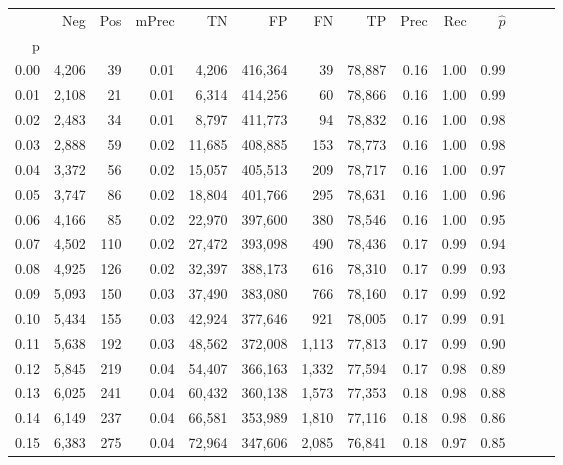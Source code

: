 \begin{tabular}{rrrrrrrrrrrrrr}
\toprule
{} &    Neg &    Pos & mPrec &       TN &       FP &      FN &      TP &  Prec &   Rec & $\hat{p}$ \\
p    &        &        &       &          &          &         &         &       &       &           \\
\midrule
0.00 &  4,206 &     39 &  0.01 &    4,206 &  416,364 &      39 &  78,887 &  0.16 &  1.00 &      0.99 \\
0.01 &  2,108 &     21 &  0.01 &    6,314 &  414,256 &      60 &  78,866 &  0.16 &  1.00 &      0.99 \\
0.02 &  2,483 &     34 &  0.01 &    8,797 &  411,773 &      94 &  78,832 &  0.16 &  1.00 &      0.98 \\
0.03 &  2,888 &     59 &  0.02 &   11,685 &  408,885 &     153 &  78,773 &  0.16 &  1.00 &      0.98 \\
0.04 &  3,372 &     56 &  0.02 &   15,057 &  405,513 &     209 &  78,717 &  0.16 &  1.00 &      0.97 \\
0.05 &  3,747 &     86 &  0.02 &   18,804 &  401,766 &     295 &  78,631 &  0.16 &  1.00 &      0.96 \\
0.06 &  4,166 &     85 &  0.02 &   22,970 &  397,600 &     380 &  78,546 &  0.16 &  1.00 &      0.95 \\
0.07 &  4,502 &    110 &  0.02 &   27,472 &  393,098 &     490 &  78,436 &  0.17 &  0.99 &      0.94 \\
0.08 &  4,925 &    126 &  0.02 &   32,397 &  388,173 &     616 &  78,310 &  0.17 &  0.99 &      0.93 \\
0.09 &  5,093 &    150 &  0.03 &   37,490 &  383,080 &     766 &  78,160 &  0.17 &  0.99 &      0.92 \\
0.10 &  5,434 &    155 &  0.03 &   42,924 &  377,646 &     921 &  78,005 &  0.17 &  0.99 &      0.91 \\
0.11 &  5,638 &    192 &  0.03 &   48,562 &  372,008 &   1,113 &  77,813 &  0.17 &  0.99 &      0.90 \\
0.12 &  5,845 &    219 &  0.04 &   54,407 &  366,163 &   1,332 &  77,594 &  0.17 &  0.98 &      0.89 \\
0.13 &  6,025 &    241 &  0.04 &   60,432 &  360,138 &   1,573 &  77,353 &  0.18 &  0.98 &      0.88 \\
0.14 &  6,149 &    237 &  0.04 &   66,581 &  353,989 &   1,810 &  77,116 &  0.18 &  0.98 &      0.86 \\
0.15 &  6,383 &    275 &  0.04 &   72,964 &  347,606 &   2,085 &  76,841 &  0.18 &  0.97 &      0.85 \\

\end{tabular}
